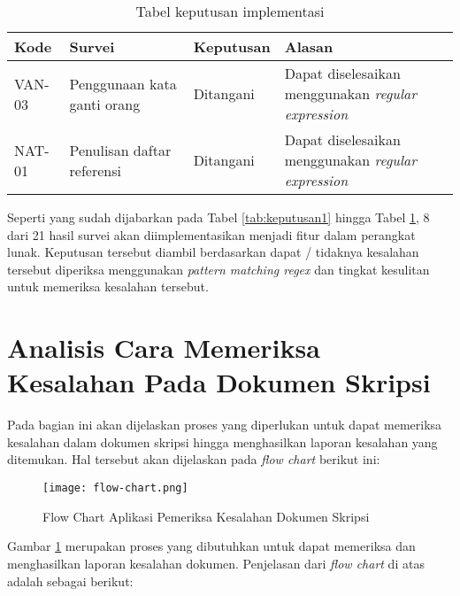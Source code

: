 \begin{table}[H]
	\renewcommand{\arraystretch}{1.5}
	\caption {Tabel keputusan implementasi} \label{tab:keputusan4}
	\begin{center}
		\begin{tabular}{|p{1.5 cm}|>{\raggedright} p{4.3 cm}| p{2.2 cm}| p{6.5 cm}|}
		\hline
		Kode & Survei & Keputusan & Alasan \\ 
		\hline 
		VAN-03 & Penggunaan kata ganti orang & Ditangani & Dapat diselesaikan menggunakan \textit{regular expression} \newline \\ 
		\hline 
		NAT-01 & Penulisan daftar referensi & Ditangani & Dapat diselesaikan menggunakan \textit{regular expression} \newline \\ 
		\hline 
		\end{tabular}
	\end{center}
\end{table}

Seperti yang sudah dijabarkan pada Tabel \ref{tab:keputusan1} hingga Tabel \ref{tab:keputusan4}, 8 dari 21 hasil survei akan diimplementasikan menjadi fitur dalam perangkat lunak. Keputusan tersebut diambil berdasarkan dapat / tidaknya kesalahan tersebut diperiksa menggunakan \textit{pattern matching regex} dan tingkat kesulitan untuk memeriksa kesalahan tersebut.

\section{Analisis Cara Memeriksa Kesalahan Pada Dokumen Skripsi}

Pada bagian ini akan dijelaskan proses yang diperlukan untuk dapat memeriksa kesalahan dalam dokumen skripsi hingga menghasilkan laporan kesalahan yang ditemukan. Hal tersebut akan dijelaskan pada \textit{flow chart} berikut ini:

\begin{figure}[H]
	\centering	
	\texttt{[image: flow-chart.png]}
	\caption{Flow Chart Aplikasi Pemeriksa Kesalahan Dokumen Skripsi}	
	\label{fig:flow-chart} 
\end{figure}

Gambar \ref{fig:flow-chart} merupakan proses yang dibutuhkan untuk dapat memeriksa dan menghasilkan laporan kesalahan dokumen. Penjelasan dari \textit{flow chart} di atas adalah sebagai berikut:


